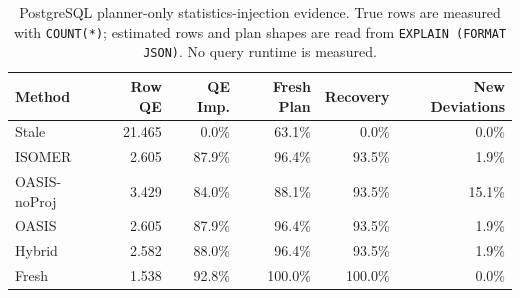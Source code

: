 \begin{table}[t]
  \centering
  \small
  \caption{PostgreSQL planner-only statistics-injection evidence. True rows are measured with \texttt{COUNT(*)}; estimated rows and plan shapes are read from \texttt{EXPLAIN (FORMAT JSON)}. No query runtime is measured.}
  \label{tab:postgres_planner_stats_injection}
  \setlength{\tabcolsep}{4pt}
  \begin{tabular}{lrrrrr}
    \toprule
    Method & Row QE & QE Imp. & Fresh Plan & Recovery & New Deviations \\
    \midrule
    Stale & 21.465 & 0.0\% & 63.1\% & 0.0\% & 0.0\% \\
    ISOMER & 2.605 & 87.9\% & 96.4\% & 93.5\% & 1.9\% \\
    OASIS-noProj & 3.429 & 84.0\% & 88.1\% & 93.5\% & 15.1\% \\
    OASIS & 2.605 & 87.9\% & 96.4\% & 93.5\% & 1.9\% \\
    Hybrid & 2.582 & 88.0\% & 96.4\% & 93.5\% & 1.9\% \\
    Fresh & 1.538 & 92.8\% & 100.0\% & 100.0\% & 0.0\% \\
    \bottomrule
  \end{tabular}
\end{table}
